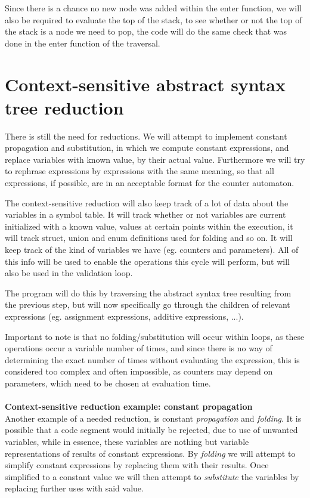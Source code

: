 \documentclass[12pt]{thesis}
\begin{document}
Since there is a chance no new node was added within the enter function, we will also be required to evaluate the top of the stack, to see whether or not the top of the stack is a node we need to pop, the code will do the same check that was done in the enter function of the traversal.

\section{Context-sensitive abstract syntax tree reduction}
There is still the need for reductions. We will attempt to implement constant propagation and substitution, in which we compute constant expressions, and replace variables with known value, by their actual value. Furthermore we will try to rephrase expressions by expressions with the same meaning, so that all expressions, if possible, are in an acceptable format for the counter automaton.

The context-sensitive reduction will also keep track of a lot of data about the variables in a symbol table. It will track whether or not variables are current initialized with a known value, values at certain points within the execution, it will track struct, union and enum definitions used for folding and so on. It will keep track of the kind of variables we have (eg. counters and parameters). All of this info will be used to enable the operations this cycle will perform, but will also be used in the validation loop.

The program will do this by traversing the abstract syntax tree resulting from the previous step, but will now specifically go through the children of relevant expressions (eg. assignment expressions, additive expressions, ...).

Important to note is that no folding/substitution will occur within loops, as these operations occur a variable number of times, and since there is no way of determining the exact number of times without evaluating the expression, this is considered too complex and often impossible, as counters may depend on parameters, which need to be chosen at evaluation time.\\
\\
\noindent
\textbf{Context-sensitive reduction example: constant propagation}\\
Another example of a needed reduction, is constant \textit{propagation} and \textit{folding}. It is possible that a code segment would initially be rejected, due to use of unwanted variables, while in essence, these variables are nothing but variable representations of results of constant expressions. By \textit{folding} we will attempt to simplify constant expressions by replacing them with their results. Once simplified to a constant value we will then attempt to \textit{substitute} the variables by replacing further uses with said value.
\end{document}

